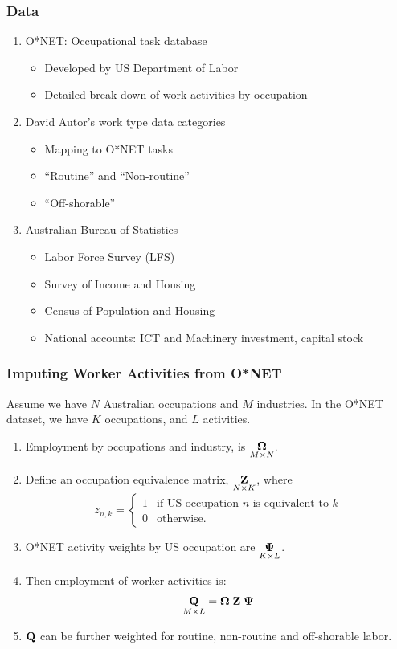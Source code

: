 \documentclass[red]{beamer}
\begin{document}
\begin{frame}
  \frametitle{Data}
  \begin{enumerate}
  \item O*NET: Occupational task database
    \begin{itemize}
    \item Developed by US Department of Labor
    \item Detailed break-down of work activities by occupation
    \end{itemize}
  \item David Autor's work type data categories
    \begin{itemize}
    \item Mapping to O*NET tasks
    \item ``Routine'' and ``Non-routine''
    \item ``Off-shorable''
    \end{itemize}
  \item Australian Bureau of Statistics
    \begin{itemize}
    \item Labor Force Survey (LFS)
    \item Survey of Income and Housing
    \item Census of Population and Housing
    \item National accounts: ICT and Machinery investment, capital stock
    \end{itemize}
  \end{enumerate}
\end{frame}

\begin{frame}
  \frametitle{Imputing Worker Activities from O*NET}
Assume we have $N$ Australian occupations and $M$ industries.
In the O*NET dataset, we have $K$ occupations, and $L$ activities.
  \begin{enumerate}
  \item Employment by occupations and industry, is 
    $\underset{M\times N}{\bf \Omega}$.
  \item Define an occupation equivalence matrix, $\underset{N\times K}{\bf Z}$, where \vspace{-10pt}   \[
    z_{n,k} = \left\{ 
      \begin{array}{ll}1 &\text{if US occupation $n$ is equivalent to $k$}\\
      0 & \text{otherwise.}\end{array}\right.
    \]
  \item O*NET activity weights by US occupation are $\underset{K\times L}{\bf \Psi}$.
  \item Then employment of worker activities is:
    $$ \underset{M\times L}{\bf Q} = {\bf \Omega\; Z\; \Psi} $$
  \item ${\bf Q}$ can be further weighted for routine, non-routine and off-shorable labor.
  \end{enumerate}
\end{frame}
\end{document}
